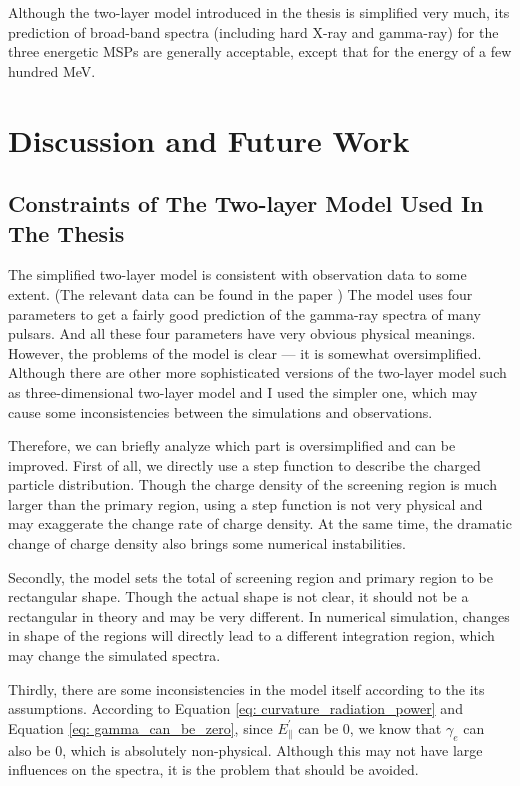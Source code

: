 \documentclass[12pt]{report}
\begin{document}
      Although the two-layer model introduced in the thesis is simplified very much, its prediction
      of broad-band spectra (including hard X-ray and gamma-ray) for the three energetic MSPs are 
      generally acceptable, except that for the energy of a few hundred MeV.

      \chapter{Discussion and Future Work}
      \section{Constraints of The Two-layer Model Used In The Thesis} 
        The simplified two-layer model is consistent with observation data to some extent. 
        (The relevant data can be found in the paper \cite{0004-637X-720-1-178})
        The model uses four parameters to get a fairly good prediction of the gamma-ray 
        spectra of many pulsars. And all these four parameters have very obvious physical 
        meanings. However, the problems of the model is clear --- it is somewhat 
        oversimplified. Although there are other more sophisticated versions of the 
        two-layer model such as three-dimensional two-layer model 
        \cite{doi:10.1111/j.1365-2966.2011.18577.x} and I used the simpler one, which may cause 
        some inconsistencies between the simulations and observations. 

        Therefore, we can briefly analyze which part is oversimplified and can be improved. 
        First of all, we directly use a step function to describe the charged particle 
        distribution. Though the charge density of the screening region is much larger than 
        the primary region, using a step function is not very physical and may exaggerate 
        the change rate of charge density. At the same time, the dramatic change of charge 
        density also brings some numerical instabilities.

        Secondly, the model sets the total of screening region and primary region to be 
        rectangular shape. Though the actual shape is not clear, it should not be a 
        rectangular in theory and may be very different. In numerical simulation, changes 
        in shape of the regions will directly lead to a different integration region, 
        which may change the simulated spectra.

        Thirdly, there are some inconsistencies in the model itself according to the its 
        assumptions. According to Equation \ref{eq: curvature_radiation_power} and Equation 
        \ref{eq: gamma_can_be_zero}, since $E_{\parallel}^{\prime}$ can be $0$, we know that 
        $\gamma_{e}$ can also be $0$, which is absolutely non-physical. Although this may not 
        have large influences on the spectra, it is the problem that should be avoided.
\end{document}
